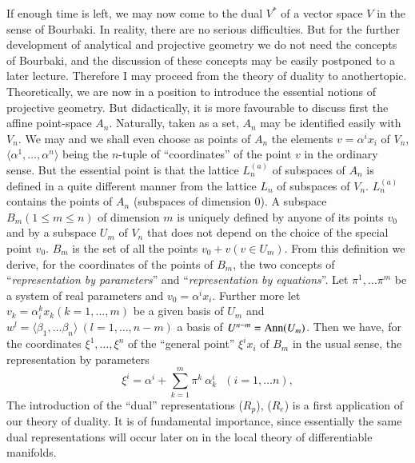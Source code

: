 If enough time is left, we may now come to the dual $V^\ast$ of a
vector space $V$ in the sense of Bourbaki. In reality, there are no
serious difficulties. But for the further development of analytical
and projective geometry we do not need the concepts of Bourbaki, and
the discussion of these concepts may be easily postponed to a later
lecture. Therefore I may proceed from the theory of duality to
another\pageoriginale topic. Theoretically, we are now in a position
to introduce the essential notions of projective geometry. But
didactically, it is more favourable to discuss first the affine
point-space $A_n$. Naturally, taken as a set, $A_n$ may be identified
easily with $V_n$. We may and we shall even choose as points of $A_n$
the elements $v =\alpha^i x_i$ of $V_n$, $\langle \alpha^1, \ldots,
\alpha^n \rangle$ being the $n$-tuple of ``coordinates'' of the point
$v$ in the ordinary sense. But the essential point is that the lattice
$L^{(a)}_n$ of subspaces of $A_n$ is defined in a quite different
manner from the lattice $L_n$ of subspaces of $V_n$. $L^{(a)}_n$
contains the points of $A_n$ (subspaces of dimension 0). A subspace
$B_m (1 \leqslant m \leqslant n)$ of dimension $m$ is uniquely defined
by anyone of its points $v_0$ and by a subspace $U_m$ of $V_n$ that
does not depend on the choice of the special point $v_0$. $B_m$ is the
set of all the points $v_0 + v (v \in U_m)$. From this definition we
derive, for the coordinates of the points of $B_m$, the two concepts
of ``\textit{representation by parameters}'' and
``\textit{representation by equations}''.  Let $\pi^1, \ldots \pi^m$
be a system of real parameters and $v_0 = \alpha^i x_i$. Further more
let $v_k = \alpha^k_i x_k (k = 1, \ldots, m)$ be a given basis of
$U_m$ and $w^l = \langle\beta_1, \ldots \beta_n \rangle~ (l=1,\ldots,
n - m)$  a basis of $U^{n-m} = \operatorname{Ann} (U_m)$. Then we have, for the
coordinates $\xi^1, \ldots, \xi^n$ of the ``general point'' $\xi^i
x_i$ of $B_m$ in the usual sense, the representation by parameters
\begin{equation*}
\xi^i = \alpha^i +\sum\limits^m_{k=1} \pi^k ~ \alpha^i_k ~~~ (i = 1,\ldots n), \tag{$R_p$}
\end{equation*}
The introduction of the ``dual'' representations ($R_p$), ($R_e$) is a
first application of our theory of duality. It is of fundamental
importance, since essentially the same dual representations will occur
later on in the local theory of differentiable manifolds.

